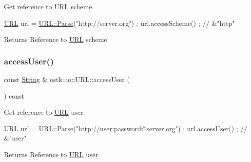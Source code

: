 Get reference to \hyperlink{classostk_1_1io_1_1_u_r_l}{U\+RL} scheme. 


\begin{DoxyCode}
\hyperlink{classostk_1_1io_1_1_u_r_l_a2537e046cef4ac966cc295abb81279c2}{URL} url = \hyperlink{classostk_1_1io_1_1_u_r_l_a1cd7216bb1079f62386a218ba510958d}{URL::Parse}(\textcolor{stringliteral}{"http://server.org"}) ;
url.accessScheme() ; \textcolor{comment}{// &"http"}
\end{DoxyCode}


\begin{DoxyReturn}{Returns}
Reference to \hyperlink{classostk_1_1io_1_1_u_r_l}{U\+RL} scheme 
\end{DoxyReturn}
\mbox{\label{classostk_1_1io_1_1_u_r_l_a793b078fb609dd5870a7c4bc9b13cf05}} 
\subsubsection{\texorpdfstring{access\+User()}{accessUser()}}
{\footnotesize\ttfamily const \hyperlink{namespaceostk_1_1io_a95d49b120613a7610cb1b4f03b1116b6}{String} \& ostk\+::io\+::\+U\+R\+L\+::access\+User (\begin{DoxyParamCaption}{ }\end{DoxyParamCaption}) const}



Get reference to \hyperlink{classostk_1_1io_1_1_u_r_l}{U\+RL} user. 


\begin{DoxyCode}
\hyperlink{classostk_1_1io_1_1_u_r_l_a2537e046cef4ac966cc295abb81279c2}{URL} url = \hyperlink{classostk_1_1io_1_1_u_r_l_a1cd7216bb1079f62386a218ba510958d}{URL::Parse}(\textcolor{stringliteral}{"http://user:password@server.org"}) ;
url.accessUser() ; \textcolor{comment}{// &"user"}
\end{DoxyCode}


\begin{DoxyReturn}{Returns}
Reference to \hyperlink{classostk_1_1io_1_1_u_r_l}{U\+RL} user 
\end{DoxyReturn}
\mbox{\label{classostk_1_1io_1_1_u_r_l_ad0e89f0fc413fb05b83759b451b8f2b7}} 
